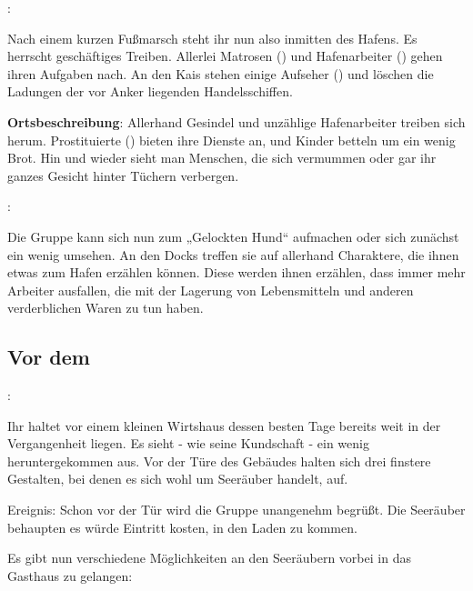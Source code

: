 
:

Nach einem kurzen Fußmarsch steht ihr nun also inmitten des Hafens. Es herrscht geschäftiges Treiben. Allerlei Matrosen (\blue{\ref{Matrosen}}) und Hafenarbeiter (\blue{\ref{Hafenarbeiter}}) gehen ihren Aufgaben nach. An den Kais stehen einige Aufseher (\blue{\ref{Aufseher}}) und löschen die Ladungen der vor Anker liegenden Handelsschiffen.

\textbf{Ortsbeschreibung}: Allerhand Gesindel und unzählige Hafenarbeiter treiben sich herum. Prostituierte (\blue{\ref{Prostituierte}}) bieten ihre Dienste an, und Kinder betteln um ein wenig Brot. Hin und wieder sieht man Menschen, die sich vermummen oder gar ihr ganzes Gesicht hinter Tüchern verbergen.

:

Die Gruppe kann sich nun zum „Gelockten Hund“ aufmachen oder sich zunächst ein wenig umsehen. An den Docks treffen sie auf allerhand Charaktere, die ihnen etwas zum Hafen erzählen können.
Diese werden ihnen erzählen, dass immer mehr Arbeiter ausfallen, die mit der Lagerung von Lebensmitteln und anderen verderblichen Waren zu tun haben.

\subsection{Vor dem }
\label{vorhund}

:

Ihr haltet vor einem kleinen Wirtshaus dessen besten Tage bereits weit in der Vergangenheit liegen. Es sieht - wie seine Kundschaft - ein wenig heruntergekommen aus. Vor der Türe des Gebäudes halten sich drei finstere Gestalten, bei denen es sich wohl um Seeräuber handelt, auf.

Ereignis: Schon vor der Tür wird die Gruppe unangenehm begrüßt. Die Seeräuber behaupten es würde Eintritt kosten, in den Laden zu kommen.

Es gibt nun verschiedene Möglichkeiten an den Seeräubern vorbei in das Gasthaus zu gelangen:


